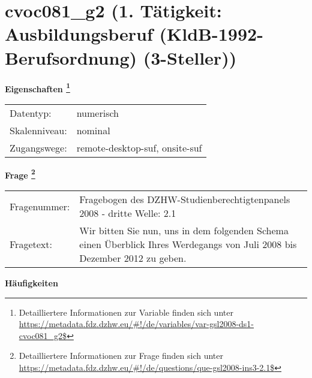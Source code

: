 
    \setcounter{footnote}{0}

    \vspace*{-1.8cm}
	\section{cvoc081\_g2 (1. Tätigkeit: Ausbildungsberuf (KldB-1992-Berufsordnung) (3-Steller))}
	\label{section:cvoc081_g2}



    \vspace*{0.5cm}
    \noindent\textbf{Eigenschaften
	\footnote{Detailliertere Informationen zur Variable finden sich unter
		\url{https://metadata.fdz.dzhw.eu/\#!/de/variables/var-gsl2008-ds1-cvoc081_g2$}}}\\
	\begin{tabularx}{\hsize}{@{}lX}
	Datentyp: & numerisch \\
	Skalenniveau: & nominal \\
	Zugangswege: &
	  remote-desktop-suf, 
	  onsite-suf
 \\
    \end{tabularx}



				\vspace*{0.5cm}
                \noindent\textbf{Frage
	                \footnote{Detailliertere Informationen zur Frage finden sich unter
		              \url{https://metadata.fdz.dzhw.eu/\#!/de/questions/que-gsl2008-ins3-2.1$}}}\\
				\begin{tabularx}{\hsize}{@{}lX}
					Fragenummer: &
					  Fragebogen des DZHW-Studienberechtigtenpanels 2008 - dritte Welle:
					  2.1
 \\
					Fragetext: & Wir bitten Sie nun, uns in dem folgenden Schema einen Überblick Ihres Werdegangs von Juli 2008 bis Dezember 2012 zu geben. \\
				\end{tabularx}





        		\vspace*{0.5cm}
                \noindent\textbf{Häufigkeiten}

